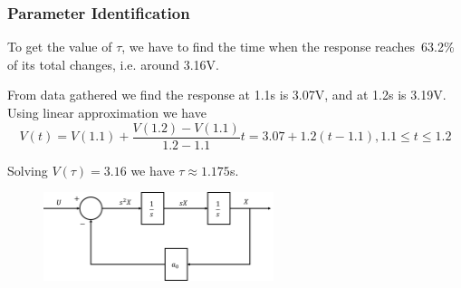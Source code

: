 \subsubsection*{Parameter Identification}
To get the value of $\tau$, we have to find the time when the response reaches\
63.2\% of its total changes, i.e. around 3.16V.

From data gathered we find the response at 1.1s is 3.07V, and at 1.2s is 3.19V.
Using linear approximation we have 
\[V(t) = V(1.1) + \frac{V(1.2)-V(1.1)}{1.2-1.1}t = 3.07+1.2(t-1.1),
                                                          1.1\leq t \leq 1.2\]

Solving $V(\tau)=3.16$ we have $\tau\approx 1.175$s.

\begin{figure}
  \centering
  \includegraphics[width=0.6\textwidth]{pics/图片2.jpg}
\end{figure}


